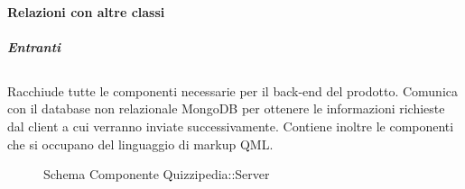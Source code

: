 \paragraph{Relazioni con altre classi}
\subparagraph{Entranti}
\subsection{}
Racchiude tutte le componenti necessarie per il back-end del prodotto. Comunica con il database non relazionale MongoDB per ottenere le informazioni richieste dal client a cui verranno inviate successivamente.
Contiene inoltre le componenti che si occupano del linguaggio di markup QML.
\begin{figure}[H]
\centering
\noindent{}
\caption[Schema Componente Server]{Schema Componente Quizzipedia::Server}
\end{figure}
